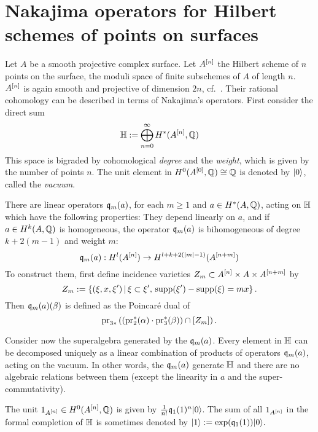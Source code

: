 \section{Nakajima operators for Hilbert schemes of points on surfaces}

Let $A$ be a smooth projective complex surface. 
Let $A^{[n]}$ the Hilbert scheme of $n$ points on the surface, \ie the moduli space of finite subschemes of $A$ of length $n$.
$A^{[n]}$ is again smooth and projective of dimension $2n$, cf.~\cite{Fogarty}. 
Their rational cohomology can be described in terms of Nakajima's \cite{Nakajima} operators. First consider the direct sum
$$
\mathbb{H} := \bigoplus_{n=0}^{\infty} H^*(A^{[n]},\mathbb{Q})
$$
This space is bigraded by cohomological \emph{degree} and the \emph{weight}, which is given by the number of points $n$. The unit element in $H^0(A^{[0]},\mathbb{Q}) \cong \mathbb{Q}$ is denoted by $|0\rangle$, called the \emph{vacuum}.
\begin{definition}
There are linear operators $\mathfrak{q}_m(a)$, for each $m\geq 1$ and $a \in H^*(A,\mathbb{Q})$, acting on $\mathbb{H}$ which have the following properties: They depend linearly on $a$, and if $a\in H^k(A,\mathbb{Q})$ is homogeneous, the operator $\mathfrak{q}_{m}(a)$ is bihomogeneous of degree $k+2(m-1)$ and weight $m$:
$$
\mathfrak{q}_{m}(a) : H^l(A^{[n]}) \rightarrow H^{l+k+2(|m|-1)}(A^{[n+m]})
$$
To construct them, first define incidence varieties $Z_m\subset A^{[n]}\times A\times A^{[n+m]}$ by
$$
Z_m := \left\{(\xi,x,\xi')\, |\, \xi\subset\xi',\, \operatorname{supp}(\xi') -\operatorname{supp}(\xi) = mx \right\}.
$$
Then $\mathfrak{q}_m(a)(\beta) $ is defined as the Poincar\'e dual of 
$$
\operatorname{pr}_{3*}\left( \left(\operatorname{pr}_2^*(\alpha)\cdot \operatorname{pr}_3^*(\beta)\right) \cap [Z_m] \right).
$$
\end{definition}
Consider now the superalgebra generated by the $\mathfrak{q}_m(a)$. 
Every element in $\mathbb{H}$ can be decomposed uniquely as a linear combination of products of operators $\mathfrak{q}_{m}(a)$, acting on the vacuum. 
In other words, the $\mathfrak{q}_m(a)$ generate $\mathbb{H}$ and there are no algebraic relations between them (except the linearity in $a$ and the super-commutativity).
\begin{example}
The unit $1_{A^{[n]}} \in H^0({A^{[n]}},\mathbb{Q})$ is given by $\frac{1}{n!}\mathfrak{q}_1(1)^n|0\rangle$. The sum of all $1_{A^{[n]}}$ in the formal completion of $\mathbb{H}$ is sometimes denoted by
$
\left|1\right> := \exp(\mathfrak{q}_1(1))|0\rangle.
$
\end{example}

